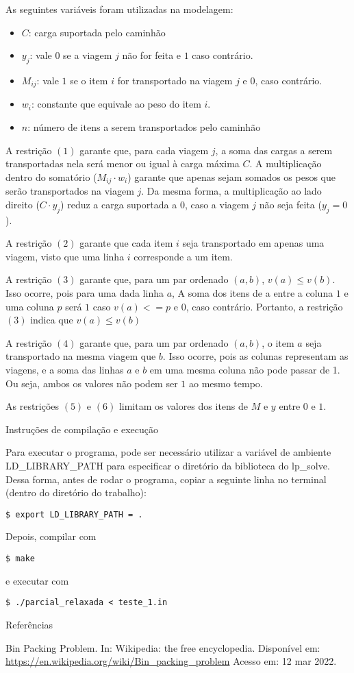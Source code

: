 \documentclass{article}
\begin{document}
As seguintes variáveis foram utilizadas na modelagem:
\begin{itemize}
    \item $C$: carga suportada pelo caminhão
    
    \item $y_j$: vale $0$ se a viagem $j$ não for feita e $1$ caso contrário.

    \item $M_{ij}$: vale $1$ se o item $i$ for transportado na viagem $j$
    e $0$, caso contrário.

    \item $w_i$: constante que equivale ao peso do item $i$.
    
    \item $n$: número de itens a serem transportados pelo caminhão
\end{itemize}

A restrição $(1)$ garante que, para cada viagem $j$, a soma das cargas a serem transportadas nela será menor ou igual à carga máxima $C$. A multiplicação dentro do somatório ($M_{ij} \cdot w_i$) garante que apenas sejam somados os pesos que serão transportados na viagem $j$. Da mesma forma, a multiplicação ao lado direito ($C \cdot y_j$) reduz a carga suportada a $0$, caso a viagem $j$ não seja feita ($y_j = 0$).

A restrição $(2)$ garante que cada item $i$ seja transportado em apenas uma viagem, visto que uma linha $i$ corresponde a um item.

A restrição $(3)$ garante que, para um par ordenado $(a,b)$, $v(a) \le v(b)$. Isso ocorre, pois para uma dada linha $a$, A soma dos itens de a entre a coluna $1$ e uma coluna $p$ será $1$ caso $v(a) <= p$ e $0$, caso contrário. Portanto, a restrição $(3)$ indica que $v(a) \le v(b)$

A restrição $(4)$ garante que, para um par ordenado $(a,b)$, o item $a$ seja transportado na mesma viagem que $b$. Isso ocorre, pois as colunas representam as viagens, e a soma das linhas $a$ e $b$ em uma mesma coluna não pode passar de 1. Ou seja, ambos os valores não podem ser $1$ ao mesmo tempo.

As restrições $(5)$ e $(6)$ limitam os valores dos itens de $M$ e $y$
entre $0$ e $1$.

\begin{section}{Instruções de compilação e execução}
    
        Para executar o programa, pode ser necessário utilizar a variável de ambiente LD\_LIBRARY\_PATH para especificar o diretório da biblioteca do lp\_solve. Dessa forma, antes de rodar o programa, copiar a seguinte linha no terminal (dentro do diretório do trabalho): 

    \texttt{\$ export LD\_LIBRARY\_PATH = .}

    Depois, compilar com 
    
    \texttt{\$ make}

    e executar com 
    
    \texttt{\$ ./parcial\_relaxada < teste\_1.in}
\end{section}

\begin{section}{Referências}

Bin Packing Problem. In: Wikipedia: the free encyclopedia. Disponível em: \url{https://en.wikipedia.org/wiki/Bin_packing_problem} Acesso em: 12 mar 2022. 

\end{section}
\end{document}
